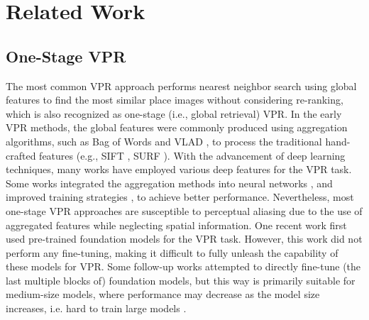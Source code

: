 \section{Related Work}
\subsection{One-Stage VPR}
The most common VPR approach performs nearest neighbor search using global features to find the most similar place images without considering re-ranking, which is also recognized as one-stage (i.e., global retrieval) VPR. In the early VPR methods, the global features were commonly produced using aggregation algorithms, such as Bag of Words \cite{BoW} and VLAD \cite{vlad2010}, to process the traditional hand-crafted features (e.g., SIFT \cite{SIFT}, SURF \cite{SURF}). With the advancement of deep learning techniques, many works \cite{sunderhaufIROS2015, crn, SPED, landmarks2, semantic,categorization1, categorization2, landmarks3, yin2019, sta-vpr, gcl, gcl2, mixvpr,cricavpr} have employed various deep features for the VPR task. Some works integrated the aggregation methods into neural networks \cite{netvlad,speNetvlad,attentionVLAD}, and improved training strategies \cite{sfrs,cosplace,gsv}, to achieve better performance. Nevertheless, most one-stage VPR approaches are susceptible to perceptual aliasing due to the use of aggregated features while neglecting spatial information. One recent work \cite{anyloc} first used pre-trained foundation models for the VPR task. However, this work did not perform any fine-tuning, making it difficult to fully unleash the capability of these models for VPR. Some follow-up works \cite{salad,boq} attempted to directly fine-tune (the last multiple blocks of) foundation models, but this way is primarily suitable for medium-size models, where performance may decrease as the model size increases, i.e. hard to train large models \cite{salad}.

